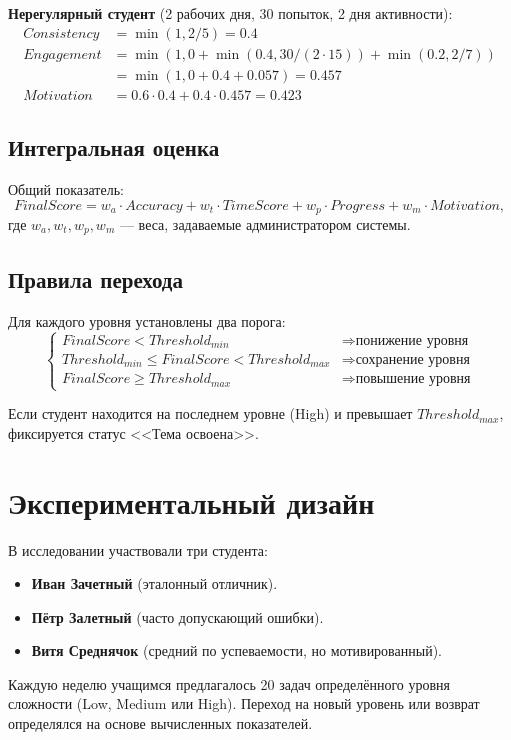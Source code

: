 \documentclass[12pt,a4paper]{article}
\begin{document}
\textbf{Нерегулярный студент} (2 рабочих дня, 30 попыток, 2 дня активности):
\[
\begin{aligned}
Consistency &= \min(1, 2/5) = 0.4 \\
Engagement &= \min(1, 0 + \min(0.4, 30/(2 \cdot 15)) + \min(0.2, 2/7)) \\
&= \min(1, 0 + 0.4 + 0.057) = 0.457 \\
Motivation &= 0.6 \cdot 0.4 + 0.4 \cdot 0.457 = 0.423
\end{aligned}
\]

\subsection{Интегральная оценка}
Общий показатель:
\[
FinalScore = w_a \cdot Accuracy + w_t \cdot TimeScore + w_p \cdot Progress + w_m \cdot Motivation,
\]
где $w_a, w_t, w_p, w_m$ — веса, задаваемые администратором системы.  



\subsection{Правила перехода}
Для каждого уровня установлены два порога:
\[
\begin{cases}
FinalScore < Threshold_{min} & \Rightarrow \text{понижение уровня} \\
Threshold_{min} \leq FinalScore < Threshold_{max} & \Rightarrow \text{сохранение уровня} \\
FinalScore \geq Threshold_{max} & \Rightarrow \text{повышение уровня}
\end{cases}
\]

Если студент находится на последнем уровне (High) и превышает $Threshold_{max}$, фиксируется статус <<Тема освоена>>.

\section{Экспериментальный дизайн}
В исследовании участвовали три студента:
\begin{itemize}
    \item \textbf{Иван Зачетный} (эталонный отличник).
    \item \textbf{Пётр Залетный} (часто допускающий ошибки).
    \item \textbf{Витя Среднячок} (средний по успеваемости, но мотивированный).
\end{itemize}

Каждую неделю учащимся предлагалось 20 задач определённого уровня сложности (Low, Medium или High). 
Переход на новый уровень или возврат определялся на основе вычисленных показателей.
\end{document}
